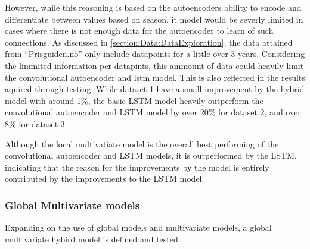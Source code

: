 However, while this reasoning is based on the autoencoders ability to encode and differentiate between values based on season,
it model would be severly limited in cases where there is not enough data for the autoencoder to learn of such connections.
As discussed in \cref{section:Data:DataExploration}, the data attained from ``Prisguiden.no'' only include datapoints
for a little over 3 years.
Considering the limmited information per datapints, this ammount of data could heavily limit the convolutional autoencoder and lstm model.
This is also reflected in the results aquired through testing.
While dataset 1 have a small improvement by the hybrid model with around 1\%,
the basic LSTM model heavily outperform the convolutional autoencoder and LSTM model by over 20\% for dataset 2, and over 8\% for dataset 3.

Although the local multivatiate model is the overall best performing of the convolutional autoencoder and LSTM models,
it is outperformed by the LSTM, indicating that the reason for the improvements by the model
is entirely contributed by the improvements to the LSTM model.





\subsubsection{Global Multivariate models}

Expanding on the use of global models and multivariate models,
a global multivariate hybird model is defined and tested.















